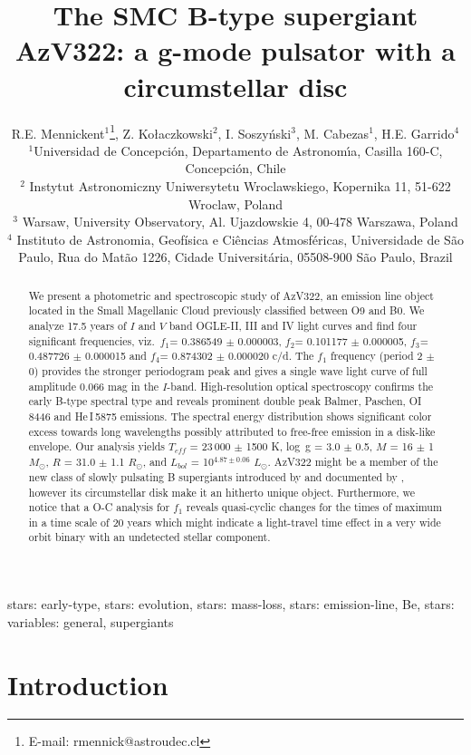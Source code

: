 \documentclass[useAMS,usenatbib]{mn2e}
\title[The SMC B-type supergiant AzV322]{The SMC B-type supergiant AzV322: a g-mode pulsator with a circumstellar disc}
\author[Mennickent et al. ]
  {R.E. Mennickent$^{1}$\thanks{E-mail: rmennick@astroudec.cl},  
  Z. Ko{\l}aczkowski$^{2}$,
     I. Soszy{\'n}ski$^{3}$, M. Cabezas$^{1}$, 
       H.E. Garrido$^{4}$
\\
  $^1$Universidad de Concepci\'on, Departamento de Astronom\'{\i}a,
      Casilla 160-C, Concepci\'on, Chile\\
      $^{2}$  Instytut Astronomiczny Uniwersytetu Wroclawskiego, Kopernika 11, 51-622 Wroclaw, Poland  \\
       $^{3}$ Warsaw, University Observatory, Al. Ujazdowskie 4, 00-478 Warszawa, Poland \\ 
    $^{4}$ Instituto de Astronomia, Geof\'isica  e Ci{\^e}ncias Atmosf\'ericas, Universidade de S{\~a}o Paulo, Rua do Mat{\~a}o 1226, Cidade Universit\'aria, 05508-900 S{\~a}o Paulo, Brazil\\
       }
\date{}
\def\msun{\hbox{$M_{\odot}$}~}
\def\rsun{$R_{\odot}$}
\def\msun{$M_{\odot}$}
\begin{document}
      
                               


\maketitle 

\begin{abstract} 

We present a photometric and spectroscopic study of AzV322, an emission line object located in the Small Magellanic Cloud previously classified between O9 and B0.
We analyze 17.5 years of $I$ and $V$ band OGLE-II, III and IV light curves and find four significant frequencies, viz.\, 
$f_1$= 0.386549 $\pm$ 0.000003, $f_2$= 0.101177 $\pm$ 0.000005, $f_3$= 0.487726  $\pm$ 0.000015 and $f_4$= 0.874302 $\pm$ 0.000020 c/d.  
The $f_1$ frequency (period 2 $\pm$ 0) provides the stronger periodogram peak and gives a single wave light curve of full amplitude 0.066 mag in the $I$-band.  High-resolution optical spectroscopy confirms the early B-type spectral type and reveals prominent double peak Balmer, Paschen, OI\,8446 and He\,I\,5875 emissions. 
The spectral energy distribution shows significant 
 color excess towards long wavelengths possibly attributed to free-free emission in a disk-like envelope. 
Our analysis yields  $T_{eff}$ = 23\,000 $\pm$ 1500 K, log\, g = 3.0 $\pm$ 0.5, $M$ = 16 $\pm$ 1 \msun, $R$ = 31.0 $\pm$ 1.1 \rsun,  and  $L_{bol}$ = 10$^{4.87 \pm 0.06}$ $L_{\odot}$. 
AzV322 might be a member of the new class of slowly pulsating B supergiants introduced by \citet{2006ApJ...650.1111S} and documented by \citet{2007A&A...463.1093L}, however its circumstellar disk make it an hitherto unique object. 
Furthermore, we notice that a  O-C analysis for $f_1$ reveals quasi-cyclic changes for the times of maximum in a time scale of 20 years which might indicate a light-travel time effect in a very wide orbit binary with an undetected stellar component. 




\end{abstract}

\begin{keywords}
stars: early-type, stars: evolution, stars: mass-loss, stars: emission-line, Be, stars: variables: general, supergiants
\end{keywords}



\section{Introduction}
\end{document}

